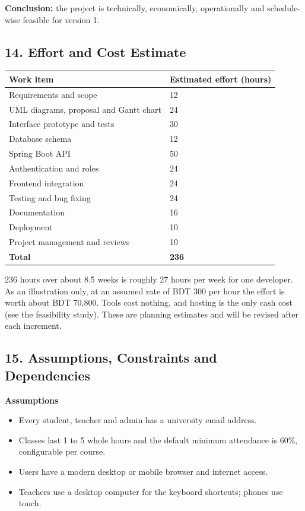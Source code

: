 \documentclass[
  11pt,
]{article}
\providecommand{\tightlist}{%
  \setlength{\itemsep}{0pt}\setlength{\parskip}{0pt}}
\begin{document}
\textbf{Conclusion:} the project is technically, economically,
operationally and schedule-wise feasible for version 1.

\hypertarget{effort-and-cost-estimate}{%
\subsection{14. Effort and Cost
Estimate}\label{effort-and-cost-estimate}}

\begin{longtable}[]{@{}ll@{}}
\toprule\noalign{}
Work item & Estimated effort (hours) \\
\midrule\noalign{}
\endhead
\bottomrule\noalign{}
\endlastfoot
Requirements and scope & 12 \\
UML diagrams, proposal and Gantt chart & 24 \\
Interface prototype and tests & 30 \\
Database schema & 12 \\
Spring Boot API & 50 \\
Authentication and roles & 24 \\
Frontend integration & 24 \\
Testing and bug fixing & 24 \\
Documentation & 16 \\
Deployment & 10 \\
Project management and reviews & 10 \\
\textbf{Total} & \textbf{236} \\
\end{longtable}

236 hours over about 8.5 weeks is roughly 27 hours per week for one
developer. As an illustration only, at an assumed rate of BDT 300 per
hour the effort is worth about BDT 70,800. Tools cost nothing, and
hosting is the only cash cost (see the feasibility study). These are
planning estimates and will be revised after each increment.

\hypertarget{assumptions-constraints-and-dependencies}{%
\subsection{15. Assumptions, Constraints and
Dependencies}\label{assumptions-constraints-and-dependencies}}

\textbf{Assumptions}

\begin{itemize}
\tightlist
\item
  Every student, teacher and admin has a university email address.
\item
  Classes last 1 to 5 whole hours and the default minimum attendance is
  60\%, configurable per course.
\item
  Users have a modern desktop or mobile browser and internet access.
\item
  Teachers use a desktop computer for the keyboard shortcuts; phones use
  touch.
\end{itemize}
\end{document}
